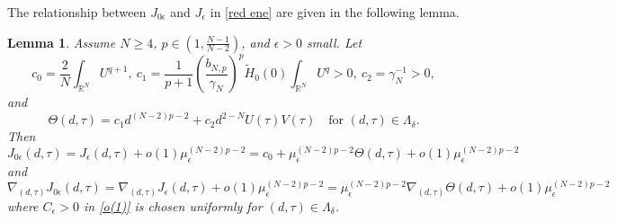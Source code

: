 \documentclass[reqno]{amsart}
\newtheorem{lemma}[theorem]{Lemma}
\theoremstyle{remark}
\newcommand{\ep}{\epsilon}
\newcommand{\ga}{\gamma}
\newcommand{\R}{\mathbb{R}}
\newcommand{\wth}{\widetilde{H}}
\renewcommand{\(}{\left(}
\renewcommand{\)}{\right)}
\numberwithin{equation}{section}
\begin{document}
The relationship between $J_{0\ep}$ and $J_\ep$ in \eqref{red ene} are given in the following lemma.
\begin{lemma}\label{J0ep Jep}
Assume $N \ge 4$, $p \in (1,\frac{N-1}{N-2})$, and $\ep > 0$ small. Let
\begin{equation}\label{c0c1c2}
c_0 = \frac{2}{N}\int_{\R^N}U^{q+1},\ c_1 = \frac{1}{p+1}\(\frac{b_{N,p}}{\ga_N}\)^p\wth_0(0) \int_{\R^N}U^q > 0,\ c_2 = \ga_N^{-1} > 0,
\end{equation}
and
\begin{equation}\label{theta}
\Theta(d,\tau) = c_1d^{(N-2)p-2} + c_2d^{2-N}U(\tau)V(\tau) \quad \text{for } (d,\tau) \in \Lambda_\delta.
\end{equation}
Then
\begin{equation}\label{J0ep Jep1}
J_{0\ep}(d,\tau) = J_{\ep}(d,\tau) + o(1)\mu_\ep^{(N-2)p-2} = c_0 + \mu_\ep^{(N-2)p-2} \Theta(d,\tau) + o(1)\mu_\ep^{(N-2)p-2}
\end{equation}
and
\begin{equation}\label{J0ep Jep2}
\nabla_{(d,\tau)} J_{0\ep}(d,\tau) = \nabla_{(d,\tau)}J_{\ep}(d,\tau) + o(1)\mu_\ep^{(N-2)p-2} = \mu_\ep^{(N-2)p-2} \nabla_{(d,\tau)} \Theta(d,\tau) + o(1)\mu_\ep^{(N-2)p-2}
\end{equation}
where $C_\ep > 0$ in \eqref{o(1)} is chosen uniformly for $(d,\tau)\in \Lambda_\delta$.
\end{lemma}
\end{document}
